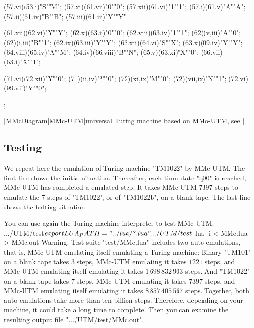 \MTinput(57.vi)(53.i)"S""M";
\MTinput(57.xi)(61.vii)"0""0";
\MTinput(57.xii)(61.vi)"1""1";
\MTinput(57.i)(61.v)"A""A";
\MTinput(57.ii)(61.iv)"B""B";
\MTinput(57.iii)(61.iii)"Y""Y";

\MTinput(61.xii)(62.vi)"Y""Y";
\MTinput(62.x)(63.ii)"0""0";
\MTinput(62.viii)(63.iv)"1""1";
\MTauto(62)(v,iii)"A""0";
\MTauto(62)(i,iii)"B""1";
\MTinput(62.ix)(63.iii)"Y""Y";
\MTinput(63.xii)(64.vi)"S""X";
\MTinput(63.x)(09.iv)"Y""Y";
\MTinput(64.viii)(65.iv)"A""M";
\MTinput(64.iv)(66.viii)"B""N";
\MTinput(65.v)(63.xi)"X""0";
\MTinput(66.vii)(63.i)"X""1";

\MTinput(71.vi)(72.xii)"Y""0";
\MTauto(71)(ii,iv)"*""0";
\MTauto(72)(xi,ix)"M""0";
\MTauto(72)(vii,ix)"N""1";
\MTinput(72.vi)(99.xii)"Y""0";


\MTendfig;

\dest
\centerline{|MMcDiagram|MMc-UTM|universal Turing
 machine based on MMo-UTM, see |\box\MTbox}

\vfill\break


\subsection{Testing}

We repeat here the emulation of Turing machine "TM1022" by MMc-UTM.
The first line shows the initial situation.
Thereafter, each time state "q00" is reached,
 MMc-UTM has completed a emulated step.
It takes MMc-UTM 7397 steps to emulate the 7 steps of "TM1022",
or of "TM1022b", on a blank tape.
The last line shows the halting situation.
\medskip

\medskip

You can use again the Turing machine interpreter to test MMc-UTM.
\begincode
.../UTM/test$ export LUA_PATH="../lua/?.lua"
.../UTM/test$ lua -i < MMc.lua > MMc.out
\endcode
Warning: Test suite "test/MMc.lua" includes two auto-emulations,
that is, MMc-UTM emulating itself emulating a Turing machine:
\beginpoints
\point Binary "TM101" on a blank tape takes $3$ steps,
 MMc-UTM emulating it takes $1221$ steps, and
 MMc-UTM emulating itself emulating it takes
 $1\,698\,832\,903$ steps.
\point And "TM1022" on a blank tape takes $7$ steps,
 MMc-UTM emulating it takes $7397$ steps, and
 MMc-UTM emulating itself emulating it takes
 $8\,857\,405\,567$ steps.
\endpoints
Together, both auto-emulations take more than ten billion steps.
Therefore, depending on your machine,
it could take a long time to complete.
Then you can examine the resulting output file ".../UTM/test/MMc.out".

